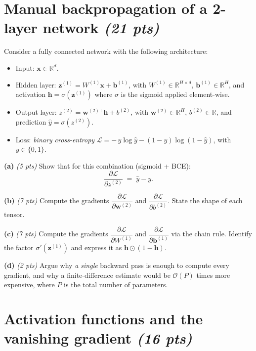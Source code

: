\documentclass[11pt,letterpaper]{article}
\newcommand{\R}{\mathbb{R}}
\newcommand{\pts}[1]{\textit{(#1 pts)}\;}
\begin{document}
\section{Manual backpropagation of a 2-layer network \pts{21}}

Consider a fully connected network with the following architecture:

\begin{itemize}[leftmargin=1.5em, itemsep=0pt]
  \item Input: $\mathbf{x} \in \R^{d}$.
  \item Hidden layer: $\mathbf{z}^{(1)} = W^{(1)} \mathbf{x} + \mathbf{b}^{(1)}$,
        with $W^{(1)} \in \R^{H \times d}$, $\mathbf{b}^{(1)} \in \R^{H}$, and
        activation $\mathbf{h} = \sigma(\mathbf{z}^{(1)})$ where $\sigma$ is the
        sigmoid applied element-wise.
  \item Output layer: $z^{(2)} = \mathbf{w}^{(2)\top} \mathbf{h} + b^{(2)}$,
        with $\mathbf{w}^{(2)} \in \R^{H}$, $b^{(2)} \in \R$, and prediction
        $\hat{y} = \sigma(z^{(2)})$.
  \item Loss: \emph{binary cross-entropy}
        $\mathcal{L} = -\,y \log \hat{y} - (1-y)\log(1-\hat{y})$, with $y \in \{0,1\}$.
\end{itemize}

\textbf{(a)} \pts{5} Show that for this combination (sigmoid + BCE):
$$
\frac{\partial \mathcal{L}}{\partial z^{(2)}} \;=\; \hat{y} - y.
$$

\textbf{(b)} \pts{7} Compute the gradients
$\dfrac{\partial \mathcal{L}}{\partial \mathbf{w}^{(2)}}$ and
$\dfrac{\partial \mathcal{L}}{\partial b^{(2)}}$.
State the shape of each tensor.

\textbf{(c)} \pts{7} Compute the gradients
$\dfrac{\partial \mathcal{L}}{\partial W^{(1)}}$ and
$\dfrac{\partial \mathcal{L}}{\partial \mathbf{b}^{(1)}}$ via the chain rule.
Identify the factor $\sigma'(\mathbf{z}^{(1)})$ and express it as
$\mathbf{h} \odot (1 - \mathbf{h})$.

\textbf{(d)} \pts{2} Argue why \emph{a single} backward pass is enough to
compute every gradient, and why a finite-difference estimate would be
$\mathcal{O}(P)$ times more expensive, where $P$ is the total number of
parameters.

\section{Activation functions and the vanishing gradient \pts{16}}
\end{document}
